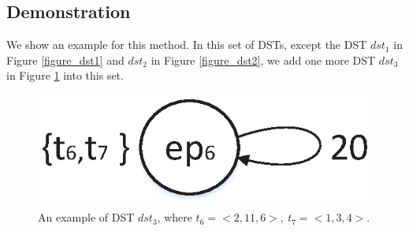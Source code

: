 \documentclass[sigconf]{acmart}
\begin{document}

\subsection{Demonstration}\label{section_demonstration}
We show an example for this method. In this set of DSTs, except the DST $dst_1$ in Figure \ref{figure_dst1} and $dst_2$ in Figure \ref{figure_dst2}, we add one more DST $dst_3$ in Figure \ref{figure_dst3} into this set.

\begin{figure}
  \centering
  \includegraphics[scale=.4]{graphics/figure_dst3.eps}
  \caption{An example of DST $dst_3$, where $t_6=<2,11,6>,\ t_7=<1,3,4>$.} 
  \label{figure_dst3}
\end{figure}
\end{document}
